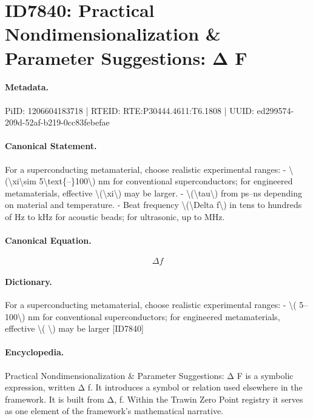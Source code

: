 \section*{ID7840: Practical Nondimensionalization \& Parameter Suggestions: Δ F}
\paragraph{Metadata.}
PiID: 1206604183718 | RTEID: RTE:P30444.4611:T6.1808 | UUID: ed299574-209d-52af-b219-0cc83febefae

\paragraph{Canonical Statement.}
For a superconducting metamaterial, choose realistic experimental ranges: - \textbackslash{}(\textbackslash{}xi\textbackslash{}sim 5\textbackslash{}text\{–\}100\textbackslash{}) nm for conventional superconductors; for engineered metamaterials, effective \textbackslash{}(\textbackslash{}xi\textbackslash{}) may be larger. - \textbackslash{}(\textbackslash{}tau\textbackslash{}) from ps–ns depending on material and temperature. - Beat frequency \textbackslash{}(\textbackslash{}Delta f\textbackslash{}) in tens to hundreds of Hz to kHz for acoustic beads; for ultrasonic, up to MHz.

\paragraph{Canonical Equation.}
\[
\Delta f
\]

\paragraph{Dictionary.}
For a superconducting metamaterial, choose realistic experimental ranges: - \textbackslash{}( 5–100\textbackslash{}) nm for conventional superconductors; for engineered metamaterials, effective \textbackslash{}( \textbackslash{}) may be larger [ID7840]

\paragraph{Encyclopedia.}
Practical Nondimensionalization \& Parameter Suggestions: Δ F is a symbolic expression, written Δ f. It introduces a symbol or relation used elsewhere in the framework. It is built from Δ, f. Within the Trawin Zero Point registry it serves as one element of the framework's mathematical narrative.
